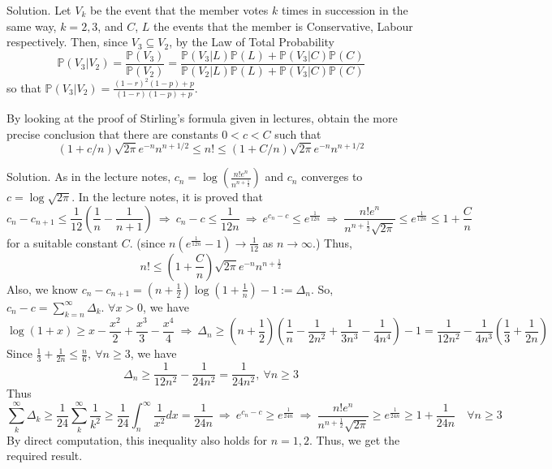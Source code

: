 Solution. Let $V_k$ be the event that the member votes $k$ times in succession in the same way, $k=2,3$, and $C$, $L$ the events that the member is Conservative, Labour respectively. Then, since $V_3\subseteq V_2$, by the Law of Total Probability
\begin{equation}
\mathbb{P}(V_3|V_2)=\frac{\mathbb{P}(V_3)}{\mathbb{P}(V_2)}=\frac{\mathbb{P}(V_3|L)\mathbb{P}(L)+\mathbb{P}(V_3|C)\mathbb{P}(C)}{\mathbb{P}(V_2|L)\mathbb{P}(L)+\mathbb{P}(V_3|C)\mathbb{P}(C)}
\end{equation}
so that $\mathbb{P}(V_3|V_2)=\frac{(1-r)^2(1-p)+p}{(1-r)(1-p)+p}$.


\item By looking at the proof of Stirling's formula given in lectures, obtain the more precise conclusion that there are constants $0<c<C$ such that
\begin{equation}
(1+c/n)\sqrt{2\pi}e^{-n}n^{n+1/2}\leq n!\leq (1+C/n)\sqrt{2\pi}e^{-n}n^{n+1/2}
\end{equation}



Solution. As in the lecture notes, $c_n=\log\left(\frac{n!e^n}{n^{n+\frac{1}{2}}}\right)$ and $c_n$ converges to $c= \log\sqrt{2\pi}$. In the lecture notes, it is proved that 
\begin{equation}
c_n-c_{n+1} \leq \frac{1}{12}\left(\frac{1}{n}-\frac{1}{n+1}\right) \ \Rightarrow \ c_n-c \leq \frac{1}{12n} \ \Rightarrow \ e^{c_n-c} \leq e^{\frac{1}{12n}} \ \Rightarrow \ \frac{n!e^n}{n^{n+\frac{1}{2}}\sqrt{2\pi}} \leq e^{\frac{1}{12n}} \leq 1+ \frac{C}{n}
\end{equation}
for a suitable constant $C$. (since $n\left(e^{\frac{1}{12n}}-1\right)\to \frac{1}{12}$ as $n\to \infty$.) Thus,  
\begin{equation}
n! \leq \left(1+ \frac{C}{n}\right) \sqrt{2\pi} e^{-n}n^{n+\frac{1}{2}}
\end{equation}
Also, we know $c_n-c_{n+1}=\left(n+\frac{1}{2}\right)\log\left(1+\frac{1}{n}\right)-1:=\Delta_n$. So, $c_n-c=\sum^\infty_{k=n}\Delta_k$. $\forall x>0$, we have
\begin{equation}
\log(1+x)\geq x-\frac{x^2}{2} + \frac{x^3}{3} - \frac{x^4}{4}\ \Rightarrow \ \Delta_n\geq \left(n+\frac{1}{2}\right)\left(\frac{1}{n}-\frac{1}{2n^2} + \frac{1}{3n^3} - \frac{1}{4n^4}\right)-1 = \frac{1}{12n^2} - \frac{1}{4n^3}\left(\frac{1}{3} + \frac{1}{2n}\right)
\end{equation}
Since $\frac{1}{3} + \frac{1}{2n}\leq \frac{n}{6},\ \forall n\geq 3$, we have
\begin{equation}
\Delta_n\geq \frac{1}{12n^2}-\frac{1}{24n^2} = \frac{1}{24n^2},\ \forall n\geq 3
\end{equation}
Thus
\begin{equation}
\sum^\infty_k\Delta_k\geq \frac{1}{24} \sum^\infty_k\frac{1}{k^2} \geq \frac{1}{24}\int^\infty_n \frac{1}{x^2}dx= \frac{1}{24n} \ \Rightarrow \ e^{c_n-c} \geq e^{\frac{1}{24n}} \ \Rightarrow \ \frac{n!e^n}{n^{n+\frac{1}{2}}\sqrt{2\pi}} \geq e^{\frac{1}{24n}} \geq 1 + \frac{1}{24n} \quad \forall n\geq 3
\end{equation}
By direct computation, this inequality also holds for $n=1,2$. Thus, we get the required result.


